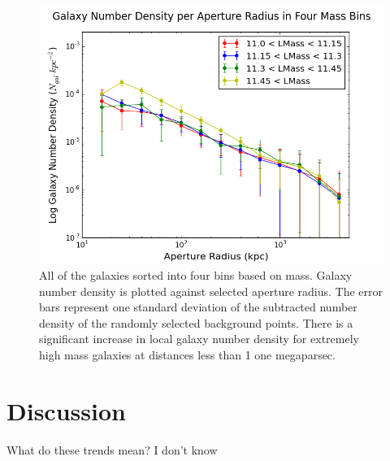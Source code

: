 \documentclass[apj]{emulateapj}
\begin{document}
\begin{figure}
\centering
\graphicspath{{C:/3d_hst/2015_finals/aperture_distance/}}
\includegraphics[width=\linewidth]{temp_lmass_final}
\caption{\footnotesize All of the galaxies sorted into four bins based on mass. Galaxy number density is plotted against selected aperture radius. The error bars represent one standard deviation of the subtracted number density of the randomly selected background points. There is a significant increase in local galaxy number density for extremely high mass galaxies at distances less than 1 one megaparsec.}
\label{fig:mass}
\end{figure}

\section{Discussion}

What do these trends mean? I don't know


\acknowledgements

\appendix



\end{document}
